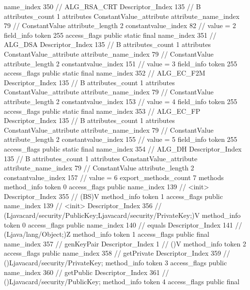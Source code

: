 {{{{{				name_index	350		// ALG_RSA_CRT
				Descriptor_Index	135		// B
				attributes_count	1
				attributes {
				ConstantValue_attribute {
					attribute_name_index	79		// ConstantValue
					attribute_length	2
					constantvalue_index	82		// value = 2
				}
				}
			}
			field_info {
				token	255
				access_flags	public static final
				name_index	351		// ALG_DSA
				Descriptor_Index	135		// B
				attributes_count	1
				attributes {
				ConstantValue_attribute {
					attribute_name_index	79		// ConstantValue
					attribute_length	2
					constantvalue_index	151		// value = 3
				}
				}
			}
			field_info {
				token	255
				access_flags	public static final
				name_index	352		// ALG_EC_F2M
				Descriptor_Index	135		// B
				attributes_count	1
				attributes {
				ConstantValue_attribute {
					attribute_name_index	79		// ConstantValue
					attribute_length	2
					constantvalue_index	153		// value = 4
				}
				}
			}
			field_info {
				token	255
				access_flags	public static final
				name_index	353		// ALG_EC_FP
				Descriptor_Index	135		// B
				attributes_count	1
				attributes {
				ConstantValue_attribute {
					attribute_name_index	79		// ConstantValue
					attribute_length	2
					constantvalue_index	155		// value = 5
				}
				}
			}
			field_info {
				token	255
				access_flags	public static final
				name_index	354		// ALG_DH
				Descriptor_Index	135		// B
				attributes_count	1
				attributes {
				ConstantValue_attribute {
					attribute_name_index	79		// ConstantValue
					attribute_length	2
					constantvalue_index	157		// value = 6
				}
				}
			}
			}
			export_methods_count	7
			methods {
				method_info {
					token	0
					access_flags	public
					name_index	139		// <init>
					Descriptor_Index	355		// (BS)V
				}
				method_info {
					token	1
					access_flags	public
					name_index	139		// <init>
					Descriptor_Index	356		// (Ljavacard/security/PublicKey;Ljavacard/security/PrivateKey;)V
				}
				method_info {
					token	0
					access_flags	public
					name_index	140		// equals
					Descriptor_Index	141		// (Ljava/lang/Object;)Z
				}
				method_info {
					token	1
					access_flags	public final
					name_index	357		// genKeyPair
					Descriptor_Index	1		// ()V
				}
				method_info {
					token	2
					access_flags	public
					name_index	358		// getPrivate
					Descriptor_Index	359		// ()Ljavacard/security/PrivateKey;
				}
				method_info {
					token	3
					access_flags	public
					name_index	360		// getPublic
					Descriptor_Index	361		// ()Ljavacard/security/PublicKey;
				}
				method_info {
					token	4
					access_flags	public final
}}}}}
